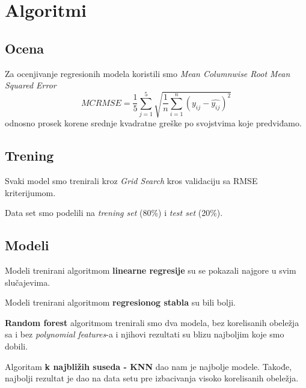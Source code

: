 \documentclass[12pt]{article}
\begin{document}
\section{Algoritmi}
\subsection{Ocena}
Za ocenjivanje regresionih modela koristili smo \textit{Mean Columnwise Root Mean Squared Error}
$$MCRMSE = \frac{1}{5}\sum_{j=1}^{5}\sqrt{\frac{1}{n}\sum_{i=1}^{n}(y_{ij}-\hat{y_{ij}})^2}$$
odnosno prosek korene srednje kvadratne greške po svojstvima koje pre\-dviđamo.

\subsection{Trening}
Svaki model smo trenirali kroz \textit{Grid Search} kros validaciju sa RMSE kriterijumom.

Data set smo podelili na \textit{trening set} (80\%) i \textit{test set} (20\%).

\onecolumn

\subsection{Modeli}
Modeli trenirani algoritmom \textbf{linearne regresije} su se pokazali najgore u svim slučajevima.

Modeli trenirani algoritmom \textbf{regresionog stabla} su bili bolji.

\textbf{Random forest} algoritmom trenirali smo dva modela, bez korelisanih obeležja sa i bez \textit{polynomial features}-a i njihovi rezultati su blizu najboljim koje smo dobili.

Algoritam \textbf{k najbližih suseda - KNN} dao nam je najbolje modele. Takođe, najbolji rezultat je dao na data setu pre izbacivanja visoko korelisanih obeležja.
\end{document}
